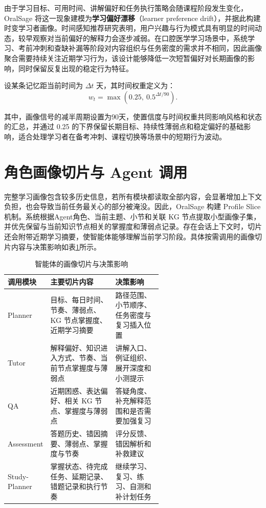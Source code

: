 由于学习目标、可用时间、讲解偏好和任务执行策略会随课程阶段发生变化，OralSage 将这一现象建模为\textbf{学习偏好漂移}（learner preference drift），并据此构建时变学习者画像。时间感知推荐研究表明，用户兴趣与行为模式具有明显的时间动态，较早观察对当前偏好的解释力会逐步减弱\cite{koren2009temporal}。在口腔医学学习场景中，系统学习、考前冲刺和查缺补漏等阶段对内容组织与任务密度的需求并不相同，因此画像聚合需要持续关注近期学习行为，该设计能够降低一次短暂偏好对长期画像的影响，同时保留反复出现的稳定行为特征。

设某条记忆距当前时间为 $\Delta t$ 天，其时间权重定义为：
\begin{equation}
  w_t=\max\left(0.25,\ 0.5^{\Delta t/90}\right).
  \label{eq:profile-recency}
\end{equation}

其中，画像信号的减半周期设置为90天，使置信度与时间权重共同影响风格和状态的汇总，并通过 0.25 的下界保留长期目标、持续性薄弱点和稳定偏好的基础影响，适合处理学习者在备考冲刺、课程切换等场景中的短期行为波动。

\section{角色画像切片与 Agent 调用}

完整学习画像包含较多历史信息，若所有模块都读取全部内容，会显著增加上下文负担，也会导致当前任务最关心的部分被淹没。因此，OralSage 构建 Profile Slice 机制。系统根据Agent角色、当前主题、小节和关联 KG 节点提取小型画像子集，并优先保留与当前知识节点相关的掌握度和薄弱点记录。存在会话上下文时，切片还会附带近期学习摘要，使智能体能够理解当前学习阶段。具体按需调用的画像切片内容与决策影响如表\ref{tab:profile-slices-agents}所示。

\begin{table}[H]
  \centering
  \caption{智能体的画像切片与决策影响}
  \label{tab:profile-slices-agents}
  \begin{tabularx}{\linewidth}{p{0.18\linewidth}p{0.42\linewidth}X}
    \toprule
    调用模块 & 主要切片内容 & 决策影响 \\
    \midrule
    Planner & 目标、每日时间、节奏、薄弱点、KG 节点掌握度、近期学习摘要 & 路径范围、小节顺序、任务密度与复习插入位置 \\
    Tutor & 解释偏好、知识进入方式、节奏、当前节点掌握度与薄弱点 & 讲解入口、例证组织、展开深度和小测提示 \\
    QA & 近期困惑、表达偏好、相关 KG 节点、掌握度与薄弱点 & 答疑角度、补充解释范围和是否需要加强复习 \\
    Assessment & 答题历史、错因摘要、薄弱点、掌握度与节奏 & 评分反馈、错因解析和补救建议 \\
    Study-Planner & 掌握状态、待完成任务、延期记录、错题记录和执行节奏 & 继续学习、复习、练习、自测和补计划任务 \\
    \bottomrule
  \end{tabularx}
\end{table}

